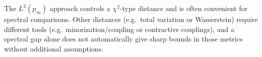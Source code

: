 



\begin{remark}
The $L^2(p_\infty)$ approach controls a $\chi^2$-type distance and is often convenient for spectral comparisons.
Other distances (e.g.\ total variation or Wasserstein) require different tools (e.g.\ minorization/coupling or contractive
couplings), and a spectral gap alone does not automatically give sharp bounds in those metrics without additional
assumptions.
\end{remark}


